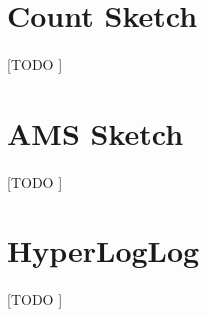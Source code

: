 \documentclass{subfiles}
\begin{document}
    \section{Count Sketch}
    \label{sec:count_sketch}

      \paragraph{}
      [TODO ]

    \section{AMS Sketch}
    \label{sec:ams_sketch}

      \paragraph{}
      [TODO ]

    \section{HyperLogLog}
    \label{sec:hyper_log_log}

      \paragraph{}
      [TODO ]
\end{document}
